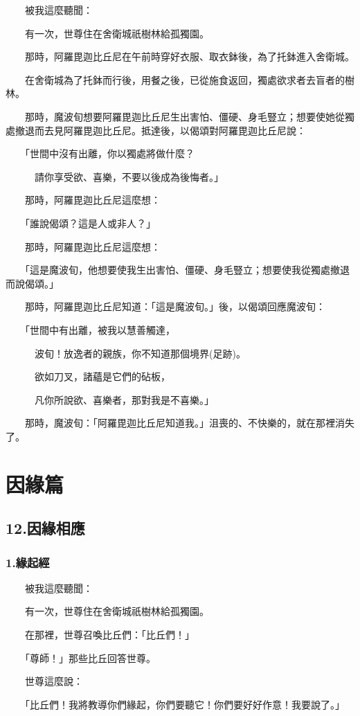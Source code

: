 \documentclass[12pt,oneside]{book}
\begin{document}
　　被我這麼聽聞：

　　有一次，世尊住在舍衛城祇樹林給孤獨園。

　　那時，阿羅毘迦比丘尼在午前時穿好衣服、取衣鉢後，為了托鉢進入舍衛城。

　　在舍衛城為了托鉢而行後，用餐之後，已從施食返回，獨處欲求者去盲者的樹林。

　　那時，魔波旬想要阿羅毘迦比丘尼生出害怕、僵硬、身毛豎立；想要使她從獨處撤退而去見阿羅毘迦比丘尼。抵達後，以偈頌對阿羅毘迦比丘尼說：

　　「世間中沒有出離，你以獨處將做什麼？

　　　請你享受欲、喜樂，不要以後成為後悔者。」

　　那時，阿羅毘迦比丘尼這麼想：

　　「誰說偈頌？這是人或非人？」

　　那時，阿羅毘迦比丘尼這麼想：

　　「這是魔波旬，他想要使我生出害怕、僵硬、身毛豎立；想要使我從獨處撤退而說偈頌。」

　　那時，阿羅毘迦比丘尼知道：「這是魔波旬。」後，以偈頌回應魔波旬：

　　「世間中有出離，被我以慧善觸達，

　　　波旬！放逸者的親族，你不知道那個境界(足跡)。

　　　欲如刀叉，諸蘊是它們的砧板，

　　　凡你所說欲、喜樂者，那對我是不喜樂。」

　　那時，魔波旬：「阿羅毘迦比丘尼知道我。」沮喪的、不快樂的，就在那裡消失了。

\part{因緣篇}
\chapter{12.因緣相應}
\section{1.緣起經}

　　被我這麼聽聞：

　　有一次，世尊住在舍衛城祇樹林給孤獨園。

　　在那裡，世尊召喚比丘們：「比丘們！」

　　「尊師！」那些比丘回答世尊。

　　世尊這麼說：

　　「比丘們！我將教導你們緣起，你們要聽它！你們要好好作意！我要說了。」
\end{document}
